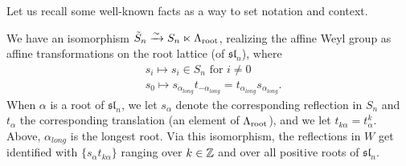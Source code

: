 
Let us recall some well-known facts as a way to set notation and context.

\begin{lemma}\label{lemma reflections}
        We have an isomorphism $\Tilde{S}_n \xrightarrow{\sim} S_n \ltimes \Lambda_{\operatorname{root}}$, realizing the affine Weyl group as affine transformations on the root lattice (of $\mathfrak{sl}_n$), where 
        \begin{align}
        &s_i \mapsto s_i \in S_n \text{ for } i\not=0 \\
        &s_0 \mapsto s_{\alpha_{long}}t_{-\alpha_{long}} = t_{\alpha_{long}} s_{\alpha_{long}}.
        \end{align}
When $\alpha$ is a root of $\mathfrak{sl}_n$, we let $s_{\alpha}$ denote the corresponding reflection in $S_n$ and $t_{\alpha}$ the corresponding translation (an element of $\Lambda_{\operatorname{root}}$), and we let $t_{k\alpha} = t_{\alpha}^k$. Above, $\alpha_{long}$ is the longest root. Via this isomorphism, the reflections in $W$ get identified with
$\{s_{\alpha}t_{k\alpha}\}$ ranging over $k \in \mathbb{Z}$ and over all positive roots of $\mathfrak{sl}_n$.
\end{lemma}
    
